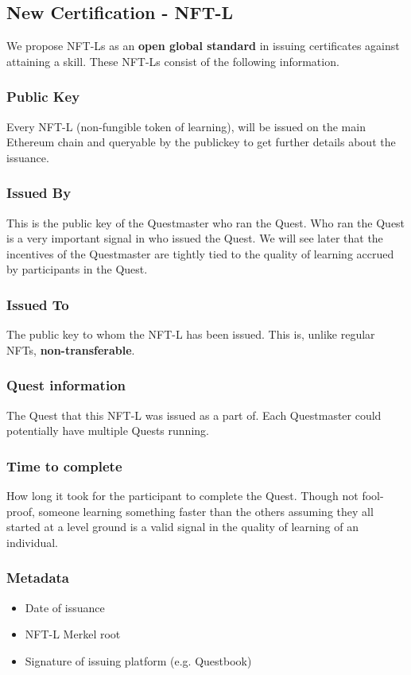 \documentclass{article}
\begin{document}
    \subsection{New Certification - NFT-L}
      We propose NFT-Ls as an \textbf{open global standard} in issuing certificates against attaining a skill. These NFT-Ls consist of the following information.
      \subsubsection{Public Key}
        Every NFT-L (non-fungible token of learning), will be issued on the main Ethereum chain and queryable by the publickey to get further details about the issuance.
      \subsubsection{Issued By}
        This is the public key of the Questmaster who ran the Quest. Who ran the Quest is a very important signal in who issued the Quest. We will see later that the incentives of the Questmaster are tightly tied to the quality of learning accrued by participants in the Quest. 
      \subsubsection{Issued To}
        The public key to whom the NFT-L has been issued. This is, unlike regular NFTs, \textbf{non-transferable}. 
      \subsubsection{Quest information}
        The Quest that this NFT-L was issued as a part of. Each Questmaster could potentially have multiple Quests running. 
      \subsubsection{Time to complete}
        How long it took for the participant to complete the Quest. Though not fool-proof, someone learning something faster than the others assuming they all started at a level ground is a valid signal in the quality of learning of an individual. 
      \subsubsection{Metadata}
        \begin{itemize}
          \item Date of issuance
          \item NFT-L Merkel root
          \item Signature of issuing platform (e.g. Questbook)
        \end{itemize}
\end{document}
